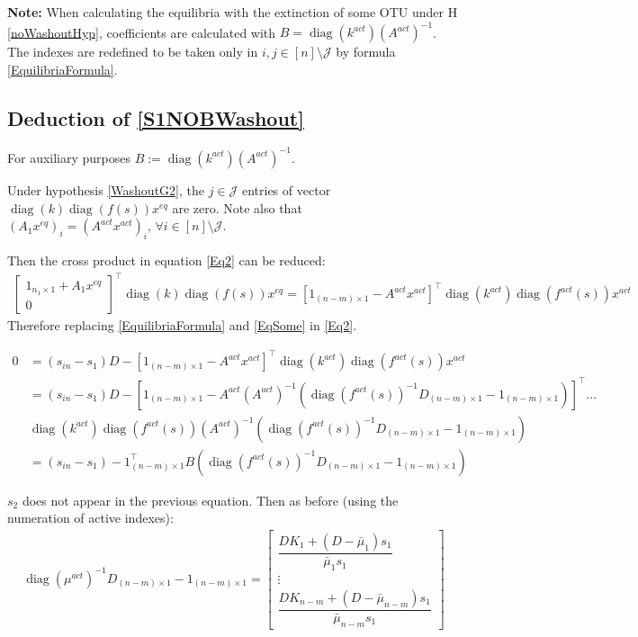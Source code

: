 \documentclass[3p,times]{article}
\DeclareMathOperator{\diag}{diag}
\begin{document}
\textbf{Note:} When calculating the equilibria with the extinction of some OTU under H \ref{noWashoutHyp}, coefficients are calculated with $B = \diag(k^{act})(A^{act})^{-1}$. The indexes are redefined to be taken only in $i,j \in [n] \setminus \mathcal{J}$ by formula \eqref{EquilibriaFormula}.

\subsection{Deduction of \eqref{S1NOBWashout}}
For auxiliary purposes $B:= \diag(k^{act})(A^{act})^{-1}$. 

Under hypothesis \ref{WashoutG2}, the $j \in \mathcal{J}$ entries of vector $\diag(k) \diag(f(s))x^{eq} $ are zero. 
Note also that $(A_1x^{eq})_i = (A^{act}x^{act})_i, \, \forall i \in [n] \setminus \mathcal{J}$.

Then the cross product in equation \eqref{Eq2} can be reduced:
\begin{align} 
\begin{bmatrix}
1_{n_1\times 1}+A_1x^{eq} \\0
\end{bmatrix}^\top \diag(k) \diag(f(s))x^{eq} = [1_{(n-m)\times 1} - A^{act}x^{act}]^\top \diag(k^{act}) \diag(f^{act}(s))x^{act} 
\end{align} 
Therefore replacing \eqref{EquilibriaFormula} and \eqref{EqSome} in \eqref{Eq2}.

\begin{align}
0 &= (s_{in}-s_1)D- [1_{(n-m)\times 1} - A^{act}x^{act}]^\top \diag(k^{act}) \diag(f^{act}(s))x^{act}\\
&= (s_{in}-s_1)D- [1_{(n-m)\times 1} - A^{act}(A^{act})^{-1}(\diag(f^{act}(s))^{-1}D_{(n-m)\times 1} - 1_{(n-m)\times 1})]^\top \dots \\ & \diag(k^{act}) \diag(f^{act}(s))(A^{act})^{-1}(\diag(f^{act}(s))^{-1}D_{(n-m)\times 1} - 1_{(n-m)\times 1})\\
&  =  (s_{in}-s_1)-1_{(n-m)\times 1}^\top
B(\diag(f^{act}(s))^{-1}D_{(n-m)\times 1} - 1_{(n-m)\times 1})
\end{align} 


$s_2$ does not appear in the previous equation. Then as before (using the numeration of active indexes):
\begin{align}
\diag(\mu^{act})^{-1}D_{(n-m)\times 1} - 1_{(n-m)\times 1} = \begin{bmatrix}
\dfrac{DK_1+(D-\bar{\mu}_1)s_1}{\bar{\mu}_{1}s_1} \\ \vdots \\ \dfrac{DK_{n-m}+(D-\bar{\mu}_{n-m})s_1}{\bar{\mu}_{n-m}s_1}
\end{bmatrix}
\end{align}
\end{document}
